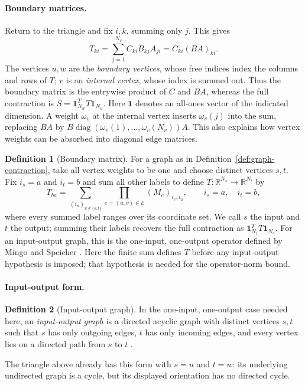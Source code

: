 \documentclass[11pt]{article}
\theoremstyle{definition}
\newtheorem{definition}{Definition}[section]
\theoremstyle{remark}
\theoremstyle{plain}
\newcommand{\R}{\mathbb R}
\newcommand{\one}{\mathbf 1}
\DeclareMathOperator{\diag}{diag}
\begin{document}
\paragraph{Boundary matrices.}
Return to the triangle and fix $i,k$, summing only $j$. This gives
\[
 T_{ki}=\sum_{j=1}^{N_v}C_{ki}B_{kj}A_{ji}
       =C_{ki}(BA)_{ki}.
\]
The vertices $u,w$ are the \emph{boundary vertices}, whose free
indices index the columns and rows of $T$; $v$ is an \emph{internal
vertex}, whose index is summed out. Thus the boundary matrix is
the entrywise product of $C$ and $BA$, whereas the full contraction
is $S=\one_{N_w}^TT\one_{N_u}$. Here $\one$ denotes an all-ones
vector of the indicated dimension. A weight $\omega_v$ at the
internal vertex inserts $\omega_v(j)$ into the sum, replacing $BA$
by $B\diag(\omega_v(1),\ldots,\omega_v(N_v))A$. This also explains
how vertex weights can be absorbed into diagonal edge matrices.

\begin{definition}[Boundary matrix]\label{def:boundary-matrix}
For a graph as in Definition~\ref{def:graph-contraction},
take all vertex weights to be one and choose
distinct vertices $s,t$. Fix $i_s=a$ and $i_t=b$ and sum all other
labels to define $T:\R^{N_s}\to\R^{N_t}$ by
\[
 T_{ba}=
 \sum_{(i_u)_{u\notin\{s,t\}}}
       \prod_{e=(u,v)\in\mathcal E}(M_e)_{i_v,i_u},
 \qquad i_s=a,\quad i_t=b,
\]
where every summed label ranges over its coordinate set. We call
$s$ the input and $t$ the output; summing their labels recovers
the full contraction as $\one_{N_t}^TT\one_{N_s}$.
For an input-output graph, this is the one-input, one-output
operator defined by Mingo and Speicher \cite[Eq.~(11), p.~2281]{mingo}.
Here the finite sum defines $T$ before any input-output hypothesis
is imposed; that hypothesis is needed for the operator-norm bound.
\end{definition}

\paragraph{Input-output form.}
\begin{definition}[Input-output graph]\label{def:input-output}
In the one-input, one-output case needed here, an \emph{input-output
graph} is a directed acyclic graph with distinct vertices $s,t$
such that $s$ has only outgoing edges, $t$ has only incoming edges,
and every vertex lies on a directed path from $s$ to $t$
\cite[Definition~10, p.~2280]{mingo}.
\end{definition}
The triangle above already has this
form with $s=u$ and $t=w$: its underlying undirected graph is a
cycle, but its displayed orientation has no directed cycle.
\end{document}
